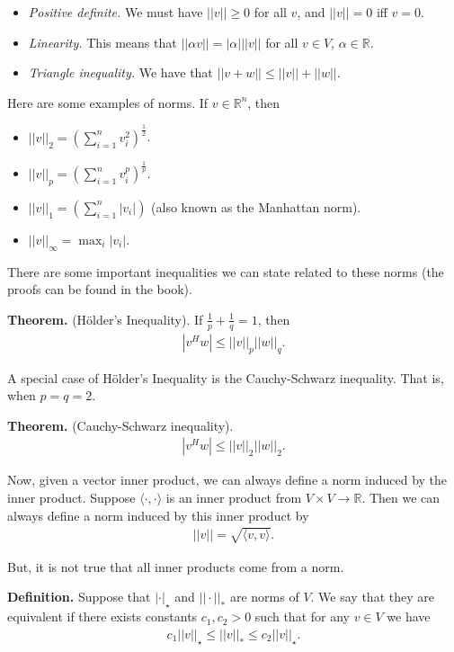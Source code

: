 \documentclass{article}
\newcommand{\RR}{\mathbb{R}}
\begin{document}
\begin{itemize}
  \item {\it Positive definite.} We must have $|| v || \geq 0$ for all $v$, and $|| v ||  =0 $ iff $v = 0$.
  \item {\it Linearity.} This means that $|| \alpha v || = | \alpha | || v || $ for all $ v \in V$, $\alpha \in \RR$.
  \item {\it Triangle inequality.} We have that $|| v + w || \leq ||v || + ||w ||$.
\end{itemize}

Here are some examples of norms.  If $v \in \RR^n$, then
\begin{itemize}
  \item $||v||_2 = \left( \sum_{i=1}^{n} v_i^2 \right)^{\frac{1}{2}}$.
  \item $||v||_p = \left( \sum_{i=1}^{n} v_i^p \right)^{\frac{1}{p}}$.
  \item $||v||_1 = \left( \sum_{i=1}^{n} |v_i|  \right)$ (also known as the Manhattan norm).
  \item $||v||_{\infty} = \max_{i} |v_i|$.
\end{itemize}

There are some important inequalities we can state related to these norms (the proofs can be found in the book).

{\bf Theorem.} (H\"older's Inequality).  If $\frac{1}{p} + \frac{1}{q} = 1$, then
\begin{align*}
  | v^H w | \leq || v||_p ||w||_q.
\end{align*}

A special case of H\"older's Inequality is the Cauchy-Schwarz inequality.  That is, when $p = q = 2$.

{\bf Theorem.} (Cauchy-Schwarz inequality).
\begin{align*}
  |v^H w| \leq ||v||_2 ||w||_2.
\end{align*}

Now, given a vector inner product, we can always define a norm induced by the inner product.  Suppose $\langle \cdot, \cdot \rangle$ is an inner product from $V \times V \to \RR$.  Then we can always define a norm induced by this inner product by
\begin{align*}
  ||v|| = \sqrt{\langle v, v\rangle}.
\end{align*}

But, it is not true that all inner products come from a norm.

{\bf Definition.} Suppose that $| \cdot |_{\star}$ and $|| \cdot ||_{*}$ are norms of $V$.  We say that they are equivalent if there exists constants $c_1, c_2 > 0$ such that for any $v \in V$ we have
\begin{align*}
  c_1 || v ||_{\star} \leq || v||_{*} \leq c_2 || v||_{\star}.
\end{align*}
\end{document}

